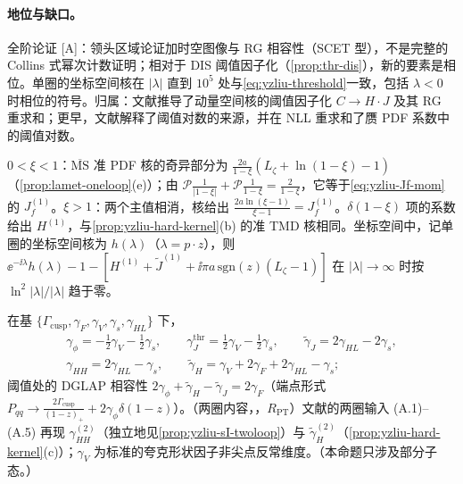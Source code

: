 \paragraph{地位与缺口。}全阶论证 [A]：领头区域论证加时空图像与 RG 相容性（SCET 型），不是完整的 Collins 式幂次计数证明；相对于 DIS 阈值因子化（\cref{prop:thr-dis}），新的要素是相位。单圈的坐标空间核在 $|\lambda|$ 直到 $10^5$ 处与\cref{eq:yzliu-threshold}一致，包括 $\lambda<0$ 时相位的符号。归属：文献\cite{Ji:2023pba}推导了动量空间核的阈值因子化 $C\to H\cdot J$ 及其 RG 重求和；更早，文献\cite{Gao:2021hxl}解释了阈值对数的来源，并在 NLL 重求和了赝 PDF 系数中的阈值对数。

\begin{example}[阈值因子化的单圈检验]\label{ex:yzliu-threshold-oneloop}
$0<\xi<1$：$\overline{\mathrm{MS}}$ 准 PDF 核的奇异部分为 $\frac{2a}{1-\xi}(L_\zeta+\ln(1-\xi)-1)$（\cref{prop:lamet-oneloop}(e)）；由 $\mathcal P\frac1{|1-\xi|}+\mathcal P\frac1{1-\xi}=\frac2{1-\xi}$，它等于\cref{eq:yzliu-Jf-mom}的 $J^{(1)}_f$。$\xi>1$：两个主值相消，核给出 $\frac{2a\ln(\xi-1)}{\xi-1}=J^{(1)}_f$。$\delta(1-\xi)$ 项的系数给出 $H^{(1)}$，与\cref{prop:yzliu-hard-kernel}(b) 的准 TMD 核相同。坐标空间中，记单圈的坐标空间核为 $h(\lambda)$（$\lambda=p\cdot z$），则 $\ee^{-\ii\lambda}h(\lambda)-1-[H^{(1)}+\tilde J^{(1)}+\ii\pi a\,\mathrm{sgn}(z)(L_\zeta-1)]$ 在 $|\lambda|\to\infty$ 时按 $\ln^2|\lambda|/|\lambda|$ 趋于零。
\end{example}

\begin{proposition}\label{prop:yzliu-ad-algebra}
在基 $\{\Gamma_{\mathrm{cusp}},\gamma_F,\gamma_V,\gamma_s,\gamma_{HL}\}$ 下，%
\begin{equation}\label{eq:yzliu-ad-algebra}
\begin{gathered}
\gamma_\phi=-\tfrac12\gamma_V-\tfrac12\gamma_s,\qquad \gamma^{\mathrm{thr}}_J=\tfrac12\gamma_V-\tfrac12\gamma_s,\qquad \tilde\gamma_J=2\gamma_{HL}-2\gamma_s,\\
\gamma_{HH}=2\gamma_{HL}-\gamma_s,\qquad \tilde\gamma_H=\gamma_V+2\gamma_F+2\gamma_{HL}-\gamma_s ;
\end{gathered}
\end{equation}
阈值处的 DGLAP 相容性 $2\gamma_\phi+\tilde\gamma_H-\tilde\gamma_J=2\gamma_F$（端点形式 $P_{qq}\to\frac{2\Gamma_{\mathrm{cusp}}}{(1-z)_+}+2\gamma_\phi\delta(1-z)$）。（两圈内容，\tagR，$R_{\mathrm{PT}}$）文献\cite{Ji:2023pba}的两圈输入 (A.1)--(A.5) 再现 $\gamma^{(2)}_{HH}$（独立地见\cref{prop:yzliu-sI-twoloop}）与 $\tilde\gamma^{(2)}_H$（\cref{prop:yzliu-hard-kernel}(c)）；$\gamma_V$ 为标准的夸克形状因子非尖点反常维度。（本命题只涉及部分子态。）
\end{proposition}

